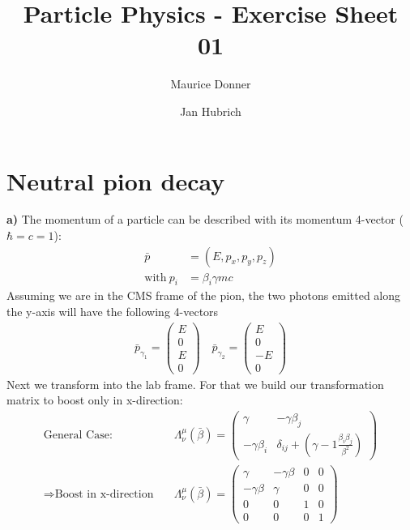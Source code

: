 \documentclass{article}
\title{\textsf{\color{blue!40!black}Particle Physics - Exercise Sheet 01}}
\author{Maurice Donner \and Jan Hubrich}
\begin{document}
\maketitle
\newpage

\section{Neutral pion decay}
\textbf{a)} The momentum of a particle can be described with its momentum 4-vector
(\( \hbar = c = 1 \)):
\begin{align}
    \bar p &= \left( E , p_x, p_y, p_z \right)\\
    \text{with} \ p_i &= \beta_i \gamma m c
\end{align}
Assuming we are in the CMS frame of the pion, the two photons emitted
along the y-axis will have the following 4-vectors
\begin{align}
    \bar p _{\gamma_1} = \left( \begin{matrix} E \\ 0 \\ E \\ 0
	\end{matrix} \right) \quad
    \bar p _{\gamma_2} = \left( \begin{matrix} E \\ 0 \\ -E \\ 0
	\end{matrix} \right)
\end{align}
Next we transform into the lab frame. For that we build our transformation
matrix to boost only in x-direction:
\begin{align}
    \text{General Case:} \quad &\Lambda^\mu_\nu( \bar \beta) = \left(
	\begin{matrix} \gamma & - \gamma \beta _j \\
	    - \gamma \beta _i & \delta _{ij} + \left(\gamma -1
	    \frac{\beta _i \beta _j}{\beta ^2} \right) \end{matrix} \right)\\
\Rightarrow \text{Boost in x-direction} \quad &\Lambda^\mu_\nu
(\bar\beta) = \left( \begin{matrix}
    \gamma & - \gamma \beta & 0 & 0 \\
    - \gamma \beta & \gamma & 0 & 0 \\
    0 & 0 & 1 & 0 \\
    0 & 0 & 0 & 1
\end{matrix} \right)
\end{align}
\end{document}
